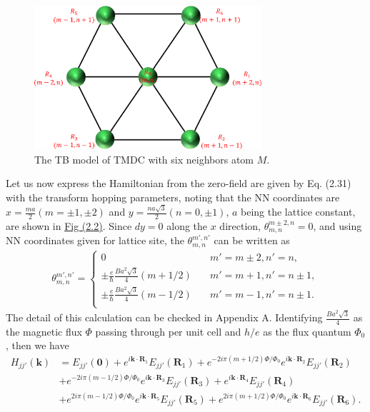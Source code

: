 \documentclass{report}
\begin{document}
\begin{figure}[H]
	\centering
	\includegraphics[width=0.75\textwidth,height=0.5\linewidth]{pic/siteindex_crop.pdf}
	\caption{\label{fig:site index} The TB model of TMDC with six neighbors atom $M$.}
\end{figure}

Let us now express the Hamiltonian from the zero-field are given by Eq. (2.31) with the transform hopping parameters, noting that the NN coordinates are $x = \frac{ma}{2}(m = \pm 1, \pm 2)$ and $y = \frac{na\sqrt{3}}{2}(n = 0,\pm 1)$, $a$ being the lattice constant, are shown in \hyperref[fig:site index]{Fig (2.2)}. Since $dy = 0$ along the $x$ direction, $\theta_{m,n}^{m \pm 2, n} = 0$, and using NN coordinates given for lattice site, the $\theta_{m,n}^{m',n'}$ can be written as
\begin{gather}
	\theta_{m,n}^{m',n'} =
	\begin{cases}
		0                                                         & \quad m' = m \pm 2, n' = n  ,    \\
		\pm \frac{e}{\hbar} \frac{B a^{2} \sqrt{3}}{4} (m + 1 /2) & \quad m' = m + 1, n' = n \pm 1 , \\
		\pm \frac{e}{\hbar} \frac{B a^{2} \sqrt{3}}{4} (m - 1 /2) & \quad m' = m - 1, n' = n \pm 1.  \\
	\end{cases}
\end{gather}
The detail of this calculation can be checked in Appendix A. Identifying $\frac{B a^{2} \sqrt{3}}{4}$ as the magnetic flux $\Phi$ passing through per unit cell and $h / e$ as the flux quantum $\Phi_{0}$, then we have
\begin{equation}
	\begin{aligned}
		H_{jj'}(\mathbf{k})
		 & = E_{jj'}(\mathbf{0}) + e^{i \mathbf{k} \cdot \mathbf{R}_{1}} E_{jj'}(\mathbf{R}_{1}) + e^{-2i\pi(m + 1/2)\Phi / \Phi_{0}} e^{i \mathbf{k} \cdot \mathbf{R}_{2}} E_{jj'}(\mathbf{R}_{2})             \\
		 & + e^{-2i\pi(m - 1/2)\Phi / \Phi_{0}} e^{i \mathbf{k} \cdot \mathbf{R}_{3}} E_{jj'}(\mathbf{R}_{3}) + e^{i \mathbf{k} \cdot \mathbf{R}_{4}} E_{jj'}(\mathbf{R}_{4})                                   \\
		 & + e^{2i\pi(m - 1/2)\Phi / \Phi_{0}} e^{i \mathbf{k} \cdot \mathbf{R}_{5}} E_{jj'}(\mathbf{R}_{5}) + e^{2i\pi(m + 1/2)\Phi / \Phi_{0}} e^{i \mathbf{k} \cdot \mathbf{R}_{6}} E_{jj'}(\mathbf{R}_{6}).
	\end{aligned}
\end{equation}
\end{document}
